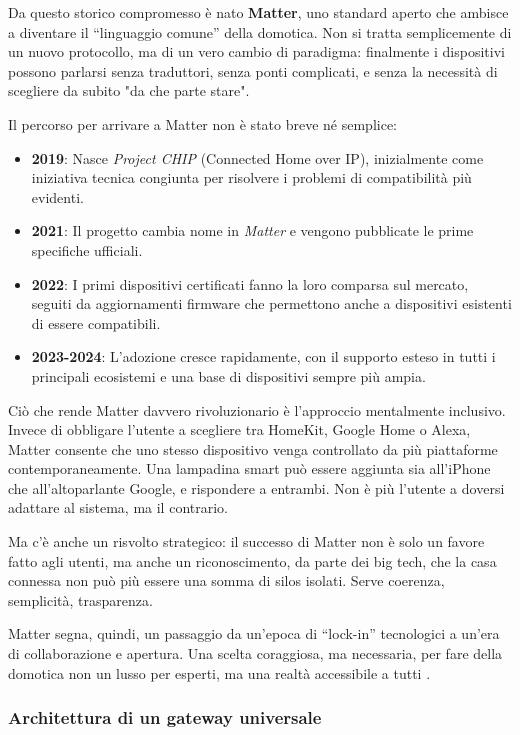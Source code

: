 Da questo storico compromesso è nato \textbf{Matter}, uno standard aperto che ambisce a diventare il “linguaggio comune” della domotica. Non si tratta semplicemente di un nuovo protocollo, ma di un vero cambio di paradigma: finalmente i dispositivi possono parlarsi senza traduttori, senza ponti complicati, e senza la necessità di scegliere da subito "da che parte stare".

Il percorso per arrivare a Matter non è stato breve né semplice:

\begin{itemize}
    \item \textbf{2019}: Nasce \textit{Project CHIP} (Connected Home over IP), inizialmente come iniziativa tecnica congiunta per risolvere i problemi di compatibilità più evidenti.
    \item \textbf{2021}: Il progetto cambia nome in \textit{Matter} e vengono pubblicate le prime specifiche ufficiali.
    \item \textbf{2022}: I primi dispositivi certificati fanno la loro comparsa sul mercato, seguiti da aggiornamenti firmware che permettono anche a dispositivi esistenti di essere compatibili.
    \item \textbf{2023-2024}: L'adozione cresce rapidamente, con il supporto esteso in tutti i principali ecosistemi e una base di dispositivi sempre più ampia.
\end{itemize}

Ciò che rende Matter davvero rivoluzionario è l'approccio mentalmente inclusivo. Invece di obbligare l’utente a scegliere tra HomeKit, Google Home o Alexa, Matter consente che uno stesso dispositivo venga controllato da più piattaforme contemporaneamente. Una lampadina smart può essere aggiunta sia all’iPhone che all’altoparlante Google, e rispondere a entrambi. Non è più l’utente a doversi adattare al sistema, ma il contrario.

Ma c’è anche un risvolto strategico: il successo di Matter non è solo un favore fatto agli utenti, ma anche un riconoscimento, da parte dei big tech, che la casa connessa non può più essere una somma di silos isolati. Serve coerenza, semplicità, trasparenza.

Matter segna, quindi, un passaggio da un’epoca di ``lock-in'' tecnologici a un’era di collaborazione e apertura. Una scelta coraggiosa, ma necessaria, per fare della domotica non un lusso per esperti, ma una realtà accessibile a tutti \cite{ConnectivityStandardsAlliance2023}.


\subsubsection{Architettura di un gateway universale}

